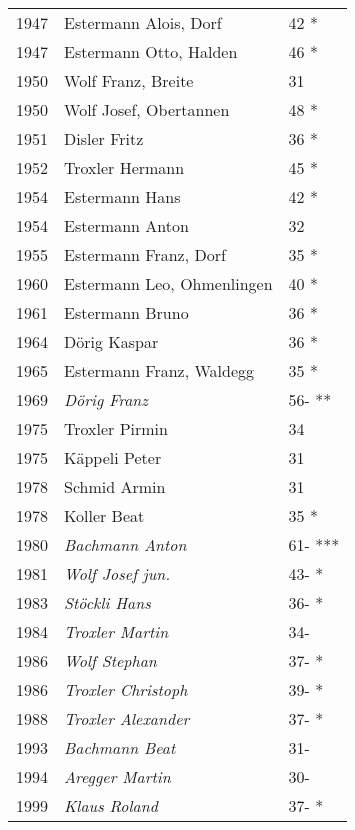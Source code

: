 {\begin{longtable}{ l l l }
        1947          & Estermann Alois, Dorf         & 42 *        \\
        1947          & Estermann Otto,  Halden       & 46 *        \\
        1950          & Wolf Franz, Breite            & 31          \\
        1950          & Wolf Josef, Obertannen        & 48 *        \\
        1951          & Disler Fritz                  & 36 *        \\
        1952          & Troxler Hermann               & 45 *        \\
        1954          & Estermann Hans                & 42 *        \\
        1954          & Estermann Anton               & 32          \\
        1955          & Estermann Franz, Dorf         & 35 *        \\
        1960          & Estermann Leo, Ohmenlingen    & 40 *        \\
        1961          & Estermann Bruno               & 36 *        \\
        1964          & Dörig Kaspar                  & 36 *        \\
        1965          & Estermann Franz, Waldegg      & 35 *        \\
        1969          & \emph{Dörig Franz}            & 56- **      \\
        1975          & Troxler Pirmin                & 34          \\
        1975          & Käppeli Peter                 & 31          \\
        1978          & Schmid Armin                  & 31          \\
        1978          & Koller Beat                   & 35 *        \\
        1980          & \emph{Bachmann Anton}         & 61- ***     \\
        1981          & \emph{Wolf Josef jun.}        & 43- *       \\
        1983          & \emph{Stöckli Hans}           & 36- *       \\
        1984          & \emph{Troxler Martin}         & 34-         \\
        1986          & \emph{Wolf Stephan}           & 37- *       \\
        1986          & \emph{Troxler Christoph}      & 39- *       \\
        1988          & \emph{Troxler Alexander}      & 37- *       \\
        1993          & \emph{Bachmann Beat}          & 31-         \\
        1994          & \emph{Aregger Martin}         & 30-         \\
        1999          & \emph{Klaus Roland}           & 37- *       \\
    \end{longtable}
    \unskip
    \unpenalty
    \unpenalty}

